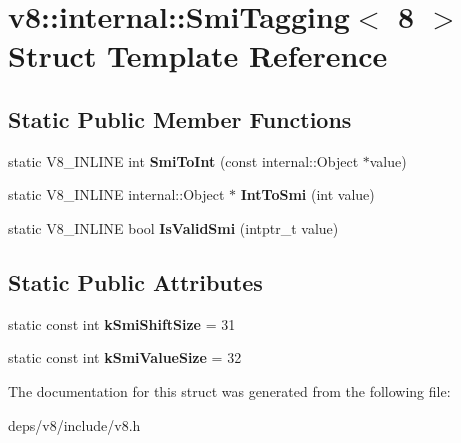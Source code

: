 \hypertarget{structv8_1_1internal_1_1_smi_tagging_3_018_01_4}{}\section{v8\+:\+:internal\+:\+:Smi\+Tagging$<$ 8 $>$ Struct Template Reference}
\label{structv8_1_1internal_1_1_smi_tagging_3_018_01_4}
\subsection*{Static Public Member Functions}
\begin{DoxyCompactItemize}
\item 
\hypertarget{structv8_1_1internal_1_1_smi_tagging_3_018_01_4_a040db1ceee3195c2463075b7b50cfda0}{}static V8\+\_\+\+I\+N\+L\+I\+N\+E int {\bfseries Smi\+To\+Int} (const internal\+::\+Object $\ast$value)\label{structv8_1_1internal_1_1_smi_tagging_3_018_01_4_a040db1ceee3195c2463075b7b50cfda0}

\item 
\hypertarget{structv8_1_1internal_1_1_smi_tagging_3_018_01_4_a1926f38e35fc98fe244e8136180d70f2}{}static V8\+\_\+\+I\+N\+L\+I\+N\+E internal\+::\+Object $\ast$ {\bfseries Int\+To\+Smi} (int value)\label{structv8_1_1internal_1_1_smi_tagging_3_018_01_4_a1926f38e35fc98fe244e8136180d70f2}

\item 
\hypertarget{structv8_1_1internal_1_1_smi_tagging_3_018_01_4_a5ab93d4cf7c3b9ceff5116b3598a1f94}{}static V8\+\_\+\+I\+N\+L\+I\+N\+E bool {\bfseries Is\+Valid\+Smi} (intptr\+\_\+t value)\label{structv8_1_1internal_1_1_smi_tagging_3_018_01_4_a5ab93d4cf7c3b9ceff5116b3598a1f94}

\end{DoxyCompactItemize}
\subsection*{Static Public Attributes}
\begin{DoxyCompactItemize}
\item 
\hypertarget{structv8_1_1internal_1_1_smi_tagging_3_018_01_4_a9a3b3da7b6d82417b961c8bed4366407}{}static const int {\bfseries k\+Smi\+Shift\+Size} = 31\label{structv8_1_1internal_1_1_smi_tagging_3_018_01_4_a9a3b3da7b6d82417b961c8bed4366407}

\item 
\hypertarget{structv8_1_1internal_1_1_smi_tagging_3_018_01_4_a08ad86fa77f6faee6ec744abdb0f6dce}{}static const int {\bfseries k\+Smi\+Value\+Size} = 32\label{structv8_1_1internal_1_1_smi_tagging_3_018_01_4_a08ad86fa77f6faee6ec744abdb0f6dce}

\end{DoxyCompactItemize}


The documentation for this struct was generated from the following file\+:\begin{DoxyCompactItemize}
\item 
deps/v8/include/v8.\+h\end{DoxyCompactItemize}
